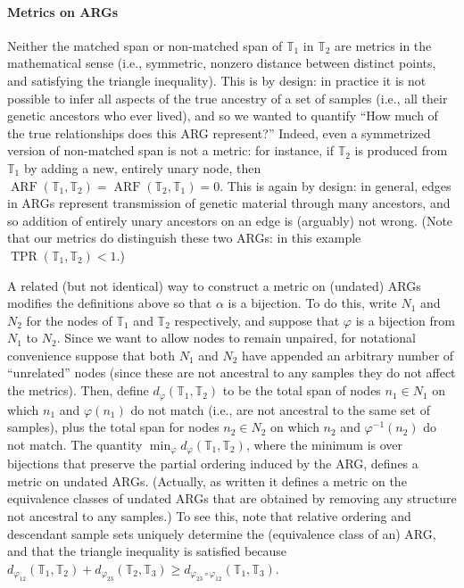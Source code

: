 \documentclass[10pt,twoside,lineno]{gsajnl}
\newcommand{\T}{\mathbb{T}}
\newcommand{\arf}{\operatorname{ARF}}
\newcommand{\tpr}{\operatorname{TPR}}
\begin{document}

\paragraph{Metrics on ARGs} 
Neither the matched span or non-matched span of $\T_1$ in $\T_2$ are metrics in the mathematical sense
(i.e., symmetric, nonzero distance between distinct points, and satisfying the triangle inequality).
This is by design: in practice it is not possible to infer all aspects
of the true ancestry of a set of samples (i.e., all their genetic ancestors who ever lived),
and so we wanted to quantify
``How much of the true relationships does this ARG represent?''
Indeed, even a symmetrized version of non-matched span is not a metric:
for instance, if $\T_2$ is produced from $\T_1$ by adding a new, entirely unary node,
then $\arf(\T_1,\T_2) = \arf(\T_2,\T_1) = 0$.
This is again by design: in general, edges in ARGs represent transmission of genetic material
through many ancestors, and so addition of entirely unary ancestors on an edge
is (arguably) not wrong.
(Note that our metrics do distinguish these two ARGs: in this example $\tpr(\T_1,\T_2) < 1$.)

A related (but not identical) way to construct a metric on (undated) ARGs
modifies the definitions above so that $\alpha$ is a bijection.
To do this, write $N_1$ and $N_2$ for the nodes of $\T_1$ and $\T_2$ respectively,
and suppose that $\varphi$ is a bijection from $N_1$ to $N_2$.
Since we want to allow nodes to remain unpaired,
for notational convenience suppose that both $N_1$ and $N_2$ have appended an arbitrary
number of ``unrelated'' nodes (since these are not ancestral to any samples they do not affect the metrics).
Then, define $d_\varphi(\T_1,\T_2)$ to be the total span of nodes $n_1 \in N_1$
on which $n_1$ and $\varphi(n_1)$ do not match (i.e., are not ancestral to the same set of samples),
plus the total span for nodes $n_2 \in N_2$ on which $n_2$ and $\varphi^{-1}(n_2)$ do not match.
The quantity $\min_\varphi d_\varphi(\T_1,\T_2)$,
where the minimum is over bijections that preserve the partial ordering induced by the ARG,
defines a metric on undated ARGs.
(Actually, as written it defines a metric on the equivalence classes of undated ARGs
that are obtained by removing any structure not ancestral to any samples.)
To see this, note that
relative ordering and descendant sample sets uniquely determine the (equivalence class of an) ARG,
and that the triangle inequality is satisfied because
$d_{\varphi_{12}}(\T_1,\T_2) + d_{\varphi_{23}}(\T_2,\T_3) \ge d_{\varphi_{23}\circ\varphi_{12}}(\T_1,\T_3)$.
\end{document}
